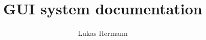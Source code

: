 \documentclass[12pt, a4paper]{article}
\begin{document}
\title{GUI system documentation}
\author{Lukas Hermann}
\maketitle

\tableofcontents

\newpage



\end{document}
